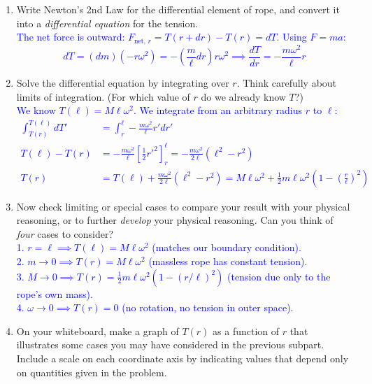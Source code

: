 \documentclass[11pt, letterpaper, openany]{book}
\newenvironment{exercise}[1][Exercise]{%
  \tcolorbox[blanker, breakable, left=1em,
    before skip=1em, after skip=1em,
    borderline west={3pt}{0pt}{PhysNavy},
    colback=PhysCream,
    before upper={\textcolor{PhysNavy}{\sffamily\bfseries #1:}\space}
  ]%
}{%
  \endtcolorbox%
}
\begin{document}
\begin{exercise}[Exercise 1]
\begin{enumerate}[label=(\alph*)]
    \item Write Newton's 2nd Law for the differential element of rope, and convert it into a \textit{differential equation} for the tension. \\
    \textcolor{blue}{
    The net force is outward: $F_{\text{net, } r} = T(r+dr) - T(r) = dT$.
    Using $F = ma$:
    \[ dT = (dm)(-r\omega^2) = -\left(\frac{m}{\ell}dr\right)r\omega^2 \implies \frac{dT}{dr} = -\frac{m\omega^2}{\ell}r \]
    }
    
    \item Solve the differential equation by integrating over $r$. Think carefully about limits of integration. (For which value of $r$ do we already know $T$?) \\
    \textcolor{blue}{
    We know $T(\ell) = M\ell\omega^2$. We integrate from an arbitrary radius $r$ to $\ell$:
    \begin{align*}
        \int_{T(r)}^{T(\ell)} dT' &= \int_{r}^{\ell} -\frac{m\omega^2}{\ell} r' dr' \\
        T(\ell) - T(r) &= -\frac{m\omega^2}{\ell} \left[ \frac{1}{2}r'^2 \right]_{r}^{\ell} = -\frac{m\omega^2}{2\ell}(\ell^2 - r^2) \\
        T(r) &= T(\ell) + \frac{m\omega^2}{2\ell}(\ell^2 - r^2) = M\ell\omega^2 + \frac{1}{2}m\ell\omega^2\left(1 - \left(\frac{r}{\ell}\right)^2\right)
    \end{align*}
    }
    
    \item Now check limiting or special cases to compare your result with your physical reasoning, or to further \textit{develop} your physical reasoning. Can you think of \textit{four} cases to consider? \\
    \textcolor{blue}{
    1. $r = \ell \implies T(\ell) = M\ell\omega^2$ (matches our boundary condition). \\
    2. $m \to 0 \implies T(r) = M\ell\omega^2$ (massless rope has constant tension). \\
    3. $M \to 0 \implies T(r) = \frac{1}{2}m\ell\omega^2(1 - (r/\ell)^2)$ (tension due only to the rope's own mass). \\
    4. $\omega \to 0 \implies T(r) = 0$ (no rotation, no tension in outer space).
    }
    
    \item On your whiteboard, make a graph of $T(r)$ as a function of $r$ that illustrates some cases you may have considered in the previous subpart. Include a scale on each coordinate axis by indicating values that depend only on quantities given in the problem. \\
    \begin{center}
\end{center}
\end{enumerate}
\end{exercise}
\end{document}
